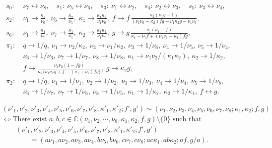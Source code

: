 \documentclass[10pt,a4paper]{amsart}
\newcommand{\C}{\mathbb {C}}     %
\begin{document}
\begin{align}
s_0 : & \: \nu_7 \leftrightarrow \nu_8 , \quad s_1 : \: \nu_5 \leftrightarrow \nu_6  , \quad s_3 : \: \nu_1 \leftrightarrow \nu_2 , \quad s_4 : \: \nu_2 \leftrightarrow \nu_3 , \quad s_5 : \: \nu_3 \leftrightarrow \nu_4 , \label{eq:AffineWeylActionE6} \\
 s_2 : & \: \nu_1 \rightarrow\frac{\kappa_2}{\nu_6}, \;
 \nu_6 \rightarrow \frac{\kappa_2}{\nu_1}, \;
 \kappa_1 \rightarrow \frac{\kappa_1\kappa_2}{\nu_1\nu_6}, \;
 f \rightarrow f\, \frac{\kappa_2 ( \nu_1 g-1)  }{ (\nu _1 \nu_6 - \kappa_2  )fg + \nu _1 \kappa_2 g - \nu _1 \nu_6 } ,\nonumber \\
 s_6 : & \: \nu_1 \rightarrow\frac{\kappa_1}{\nu_7}, \; 
 \nu_7 \rightarrow \frac{\kappa_1}{\nu_1}, \;
 \kappa_2 \rightarrow \frac{\kappa_1\kappa_2}{\nu_1\nu_7}, \;
  g \rightarrow g\, \frac{\nu _7 ( \nu_1 - f )  }{ \kappa_1  -  \nu _7 f + ( \nu _1 \nu_7 - \kappa_1 )fg } , \nonumber \\
  \pi _1 : & \: q \rightarrow 1/q, \: \nu_1 \rightarrow \nu_2 / \kappa_2 , \:  \nu_2 \rightarrow \nu_1 / \kappa_2 ,  \: \nu_3 \rightarrow 1/\nu_6,  \: \nu_4 \rightarrow 1/\nu_5, \: \nu_5 \rightarrow 1/\nu_4,  \nonumber \\
& \: \nu_6 \rightarrow 1/\nu_3, \: \nu_7 \rightarrow 1/\nu_7, \: \nu_8 \rightarrow 1/\nu_8, \: \kappa_1 \rightarrow \nu_1 \nu_2 /(\kappa_1 \kappa_2 ) , \: \kappa_2 \rightarrow 1/\kappa_2 ,\nonumber \\
& \: f \rightarrow \frac{\nu _1 \nu_2 ( 1- fg )}{ \kappa_2 \{ \nu _1 \nu_2 g + f- (\nu _1 + \nu _2 ) fg \} } , \: g \rightarrow \kappa_2 g , \nonumber \\
  \pi _2 : & \: q \rightarrow 1/q, \: \nu_1 \rightarrow 1/\nu_1, \:  \nu_2 \rightarrow 1/\nu_2,  \: \nu_3 \rightarrow 1/\nu_3,  \: \nu_4 \rightarrow 1/\nu_4, \: \nu_5 \rightarrow 1/\nu_8, \nonumber \\
& \: \nu_6 \rightarrow 1/\nu_7, \: \nu_7 \rightarrow 1/\nu_6, \: \nu_8 \rightarrow 1/\nu_5, \: \kappa_1 \rightarrow 1/\kappa_2 , \: \kappa_2 \rightarrow 1/\kappa_1 , \: f \leftrightarrow  g . \nonumber 
\end{align}

\begin{align}
&  (\nu '_1 , \nu '_2 , \nu '_3 , \nu '_4 ,\nu '_5 ,\nu '_6 , \nu '_7 ,\nu '_8 ; \kappa '_1 ,\kappa '_2 ; f' ,g' ) \sim  (\nu_1 , \nu_2 , \nu_3 , \nu_4 ,\nu_5 ,\nu_6 , \nu_7 ,\nu_8 ;\kappa_1 ,\kappa_2 ; f ,g ) \label{eq:equivE6} \\
& \Leftrightarrow \mbox{There exist } a, b, c \in \C (\nu_1 , \nu_2 , \cdots ,\nu_8 ,\kappa_1 ,\kappa_2 , f ,g ) \setminus \{ 0 \} \mbox{ such that }  \nonumber \\
& \qquad (\nu '_1 , \nu '_2 , \nu '_3 , \nu '_4 ,\nu '_5 ,\nu '_6 , \nu '_7 ,\nu '_8 ; \kappa '_1 ,\kappa '_2 ; f' ,g' )  \nonumber \\
& \qquad \qquad = (a \nu_1 , a \nu_2 , a \nu_3 , a \nu_4 ,b \nu_5 , b \nu_6 , c \nu_7 , c \nu_8 ; ac \kappa_1 , ab \kappa_2 ; af ,g/a) .  \nonumber
\end{align}
\end{document}
